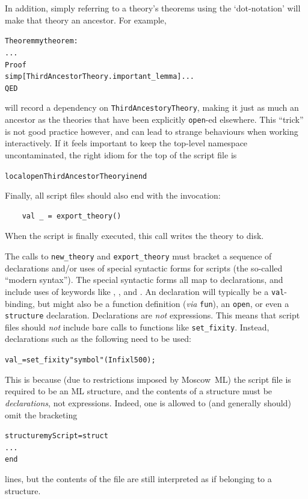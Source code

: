 In addition, simply referring to a theory's theorems using the `dot-notation' will make that theory an ancestor.
For example,
\begin{alltt}
    Theorem mytheorem:
      ...
    Proof
      simp[ThirdAncestorTheory.important_lemma] ...
    QED
\end{alltt}
will record a dependency on \texttt{ThirdAncestoryTheory}, making it just as much an ancestor as the theories that have been explicitly \texttt{open}-ed elsewhere.
This ``trick'' is not good practice however, and can lead to strange behaviours when working interactively.
If it feels important to keep the top-level \ML{} namespace uncontaminated, the right idiom for the top of the script file is
\begin{alltt}
    local open ThirdAncestorTheory in end
\end{alltt}

Finally, all script files should also end with the invocation:
\begin{verbatim}
    val _ = export_theory()
\end{verbatim}
When the script is finally executed, this call writes the theory to disk.

The calls to \texttt{new_theory} and \texttt{export_theory} must bracket a sequence of \ML{} declarations and/or uses of special syntactic forms for scripts (the so-called ``modern syntax'').
The special syntactic forms all map to \ML{} declarations, and include uses of keywords like , , and .
An \ML{} declaration will typically be a \texttt{val}-binding, but might also be a function definition (\emph{via} \texttt{fun}), an \texttt{open}, or even a \texttt{structure} declaration.
Declarations are \emph{not} expressions.
This means that script files should \emph{not} include bare calls to \HOL{} functions like \texttt{set_fixity}.
Instead, declarations such as the following need to be used:
\begin{alltt}
    val _ = set_fixity "symbol" (Infixl 500);
\end{alltt}
This is because (due to restrictions imposed by Moscow~ML) the script file is required to be an ML structure, and the contents of a structure must be \emph{declarations}, not expressions.
Indeed, one is allowed to (and generally should) omit the bracketing
\begin{alltt}
    structure myScript = struct
    ...
    end
\end{alltt}
lines, but the contents of the file are still interpreted as if belonging to a structure.

